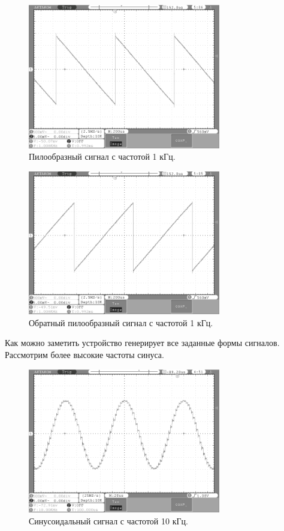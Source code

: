 	\begin{figure}[H]
    \centering
    \includegraphics[width=0.75\textwidth]{../image/l_saw1.bmp}
    \caption{Пилообразный сигнал с частотой 1 кГц.}
	\end{figure}	
	
	\begin{figure}[H]
    \centering
    \includegraphics[width=0.75\textwidth]{../image/r_saw1.bmp}
    \caption{Обратный пилообразный сигнал с частотой 1 кГц.}
	\end{figure}	
	
	Как можно заметить устройство генерирует все заданные формы сигналов. Рассмотрим более высокие частоты синуса.
	
	\begin{figure}[H]
    \centering
    \includegraphics[width=0.75\textwidth]{../image/sin10.bmp}
    \caption{Синусоидальный сигнал с частотой 10 кГц.}
	\end{figure}	
	
